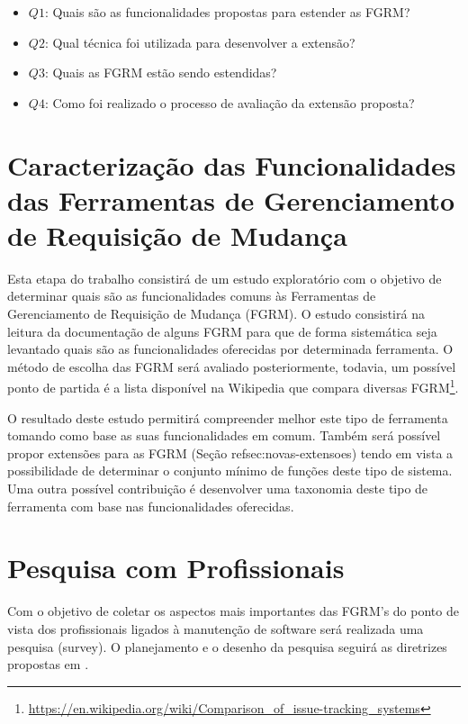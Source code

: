 \documentclass[msc,proposal,hidelot,hideabstract]{ppgccufmg} %
\begin{document}
\begin{itemize}
  \item \textbf{$Q1$}: Quais são as funcionalidades propostas para estender as FGRM?
  \item \textbf{$Q2$}: Qual técnica foi utilizada para desenvolver a extensão?
  \item \textbf{$Q3$}: Quais as FGRM estão sendo estendidas?
  \item \textbf{$Q4$}: Como foi realizado o processo de avaliação da extensão proposta?
\end{itemize}


\section{Caracterização das Funcionalidades das Ferramentas de Gerenciamento de Requisição de Mudança}
\label{sec:caracterizacao}

Esta etapa do trabalho consistirá de um estudo exploratório com o objetivo de determinar quais são as funcionalidades comuns às Ferramentas de Gerenciamento de Requisição de Mudança (FGRM). O estudo consistirá na leitura da documentação de alguns FGRM para que de forma sistemática seja levantado quais são as funcionalidades oferecidas por determinada ferramenta. O método de escolha das FGRM será avaliado posteriormente, todavia, um possível ponto de partida é a lista disponível na Wikipedia que compara diversas FGRM\footnote{\url{https://en.wikipedia.org/wiki/Comparison_of_issue-tracking_systems}}.

O resultado deste estudo permitirá compreender melhor este tipo de ferramenta tomando como base as suas funcionalidades em comum. Também será possível propor extensões para as FGRM (Seção ref{sec:novas-extensoes}) tendo em vista a possibilidade de determinar o conjunto mínimo de funções deste tipo de sistema. Uma outra possível contribuição é desenvolver uma taxonomia deste tipo de ferramenta com base nas funcionalidades oferecidas.

\section{Pesquisa com Profissionais}
\label{sec:survey}
Com o objetivo de coletar os aspectos mais importantes das FGRM's do ponto de
vista dos profissionais ligados à manutenção de software será realizada uma
 pesquisa (survey). O planejamento e o desenho da pesquisa seguirá as diretrizes propostas em \cite{wohlin2012experimentation}.
\end{document}
